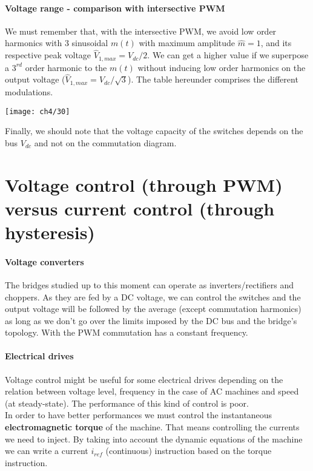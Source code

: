 		\paragraph{Voltage range - comparison with intersective PWM} \quad We must remember that, with the intersective PWM, we avoid low order harmonics with 3 sinusoidal $m(t)$ with maximum amplitude $\hat{m}=1$, and its respective peak voltage $\hat{V}_{1,max} = V_{dc}/2$. We can get a higher value if we superpose a $3^{rd}$ order harmonic to the $m(t)$ without inducing low order harmonics on the output voltage ($\hat{V}_{1,max}=V_{dc}/\sqrt{3}$). The table hereunder comprises the different modulations.
		\begin{center}
		\texttt{[image: ch4/30]}
		\end{center}
		
		Finally, we should note that the voltage capacity of the switches depends on the bus $V_{dc}$ and not on the commutation diagram. 
		
\section{Voltage control (through PWM) versus current control (through hysteresis)}
	\paragraph{Voltage converters}\quad 
	The bridges studied up to this moment can operate as inverters/rectifiers and choppers. As they are fed by a DC voltage, we can control the switches and the output voltage will be followed by the average (except commutation harmonics) as long as we don't go over the limits imposed by the DC bus and the bridge's topology. With the PWM commutation has a constant frequency. 
	
	\paragraph{Electrical drives} \quad 
	Voltage control might be useful for some electrical drives depending on the relation between voltage level, frequency in the case of AC machines and speed (at steady-state). The performance of this kind of control is poor.\\ 
	
	In order to have better performances we must control the instantaneous \textbf{electromagnetic torque} of the machine. That means controlling the currents we need to inject. By taking into account the dynamic equations of the machine we can write a current $i_{ref}$ (continuous) instruction based on the torque instruction.
	

